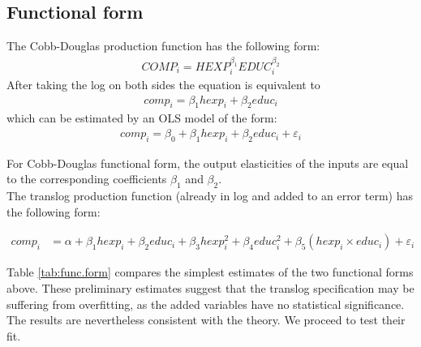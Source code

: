 \documentclass[12pt,a4paper]{article}\usepackage[]{graphicx}\usepackage[]{color}
\begin{document}
\subsection{Functional form}
The Cobb-Douglas production function has the following form:
\begin{gather}
COMP_i = HEXP_i^{\beta_1}EDUC_i^{\beta_2}
\end{gather}
After taking the log on both sides the equation is equivalent to
\begin{gather}
comp_i = \beta_1 hexp_i + \beta_2 educ_i
\end{gather}
which can be estimated by an OLS model of the form:
\begin{gather}
comp_i = \beta_0 + \beta_1 hexp_i + \beta_2 educ_i + \varepsilon_i
\end{gather}

For Cobb-Douglas functional form, the output elasticities of the inputs are equal to the corresponding coefficients $\beta_1$ and $\beta_2$. \\

The translog production function (already in log and added to an error term) has the following form: 

\begin{equation}
\label{eq:translog.nocontrols}
\begin{aligned}
comp_i &= \alpha + \beta_1 hexp_i + \beta_2 educ_i + \beta_3 hexp_i^2 + \beta_4 educ_i^2 + \beta_5 \left(hexp_i \times educ_i\right) + \varepsilon_i
\end{aligned}
\end{equation}


Table \ref{tab:func.form} compares the simplest estimates of the two functional forms above. These preliminary estimates suggest that the translog specification may be suffering from overfitting, as the added variables have no statistical significance. The results are nevertheless consistent with the theory. We proceed to test their fit.
\end{document}
